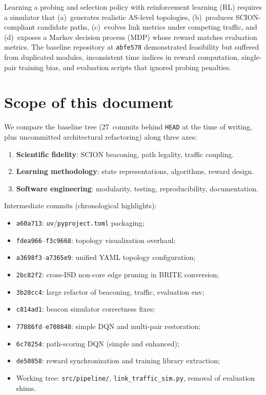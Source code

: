 \documentclass[11pt,a4paper,twoside,openright]{report}
\begin{document}
Learning a probing and selection policy with reinforcement learning (RL) requires
a simulator that (a)~generates realistic AS-level topologies,
(b)~produces SCION-compliant candidate paths,
(c)~evolves link metrics under competing traffic, and
(d)~exposes a Markov decision process (MDP) whose reward matches evaluation metrics.
The baseline repository at \texttt{abfe578} demonstrated feasibility but suffered
from duplicated modules, inconsistent time indices in reward computation,
single-pair training bias, and evaluation scripts that ignored probing penalties.

\section{Scope of this document}

We compare the baseline tree (27~commits behind \texttt{HEAD} at the time of
writing, plus uncommitted architectural refactoring) along three axes:
\begin{enumerate}[label=(\roman*)]
  \item \textbf{Scientific fidelity}: SCION beaconing, path legality, traffic coupling.
  \item \textbf{Learning methodology}: state representations, algorithms, reward design.
  \item \textbf{Software engineering}: modularity, testing, reproducibility, documentation.
\end{enumerate}

Intermediate commits (chronological highlights):
\begin{itemize}
  \item \texttt{a60a713}: \texttt{uv}/\texttt{pyproject.toml} packaging;
  \item \texttt{fdea966}--\texttt{f3c9668}: topology visualization overhaul;
  \item \texttt{a3698f3}--\texttt{a7365e9}: unified YAML topology configuration;
  \item \texttt{2bc82f2}: cross-ISD non-core edge pruning in BRITE conversion;
  \item \texttt{3b20cc4}: large refactor of beaconing, traffic, evaluation env;
  \item \texttt{c814ad1}: beacon simulator correctness fixes;
  \item \texttt{77886fd}--\texttt{e708848}: simple DQN and multi-pair restoration;
  \item \texttt{6c70254}: path-scoring DQN (simple and enhanced);
  \item \texttt{de50858}: reward synchronization and training library extraction;
  \item Working tree: \texttt{src/pipeline/}, \texttt{link\_traffic\_sim.py}, removal of evaluation shims.
\end{itemize}
\end{document}
